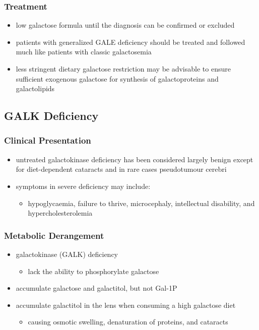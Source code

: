 \documentclass{scrartcl}
\begin{document}
\subsubsection{Treatment}
\label{sec:org68e0ba8}
\begin{itemize}
\item low galactose formula until the diagnosis can be confirmed or excluded
\item patients with generalized GALE deficiency should be treated and
followed much like patients with classic galactosemia
\item less stringent dietary galactose restriction may be advisable to
ensure sufficient exogenous galactose for synthesis of
galactoproteins and galactolipids
\end{itemize}
\subsection{GALK Deficiency}
\label{sec:org7ebe737}
\subsubsection{Clinical Presentation}
\label{sec:orgaafeb65}
\begin{itemize}
\item untreated galactokinase deficiency has been considered largely
benign except for diet-dependent cataracts and in rare cases pseudotumour cerebri
\item symptoms in severe deficiency may include:
\begin{itemize}
\item hypoglycaemia, failure to thrive, microcephaly, intellectual
disability, and hypercholesterolemia
\end{itemize}
\end{itemize}

\subsubsection{Metabolic Derangement}
\label{sec:org6c5c01f}
\begin{itemize}
\item galactokinase (GALK) deficiency
\begin{itemize}
\item lack the ability to phosphorylate galactose
\end{itemize}
\item accumulate galactose and galactitol, but not Gal-1P
\item accumulate galactitol in the lens when consuming a high galactose diet
\begin{itemize}
\item causing osmotic swelling, denaturation of proteins, and cataracts
\end{itemize}
\end{itemize}
\end{document}
